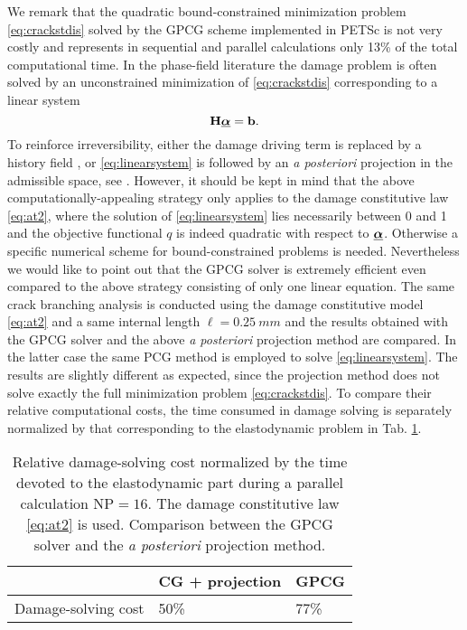 We remark that the quadratic bound-constrained minimization problem \eqref{eq:crackstdis} solved by the GPCG scheme implemented in PETSc is not very costly and represents in sequential and parallel calculations only 13\% of the total computational time. In the phase-field literature the damage problem is often solved by an unconstrained minimization of \eqref{eq:crackstdis} corresponding to a linear system
\begin{equation} \label{eq:linearsystem}
\vec{H}\dvec=\vec{b}.
\end{equation}
To reinforce irreversibility, either the damage driving term is replaced by a history field \cite{HofackerMiehe:2012,BordenVerhooselScottHughesLandis:2012}, or \eqref{eq:linearsystem} is followed by an \emph{a posteriori} projection in the admissible space, see \cite{LancioniRoyer-Carfagni:2009}. However, it should be kept in mind that the above computationally-appealing strategy only applies to the damage constitutive law \eqref{eq:at2}, where the solution of \eqref{eq:linearsystem} lies necessarily between 0 and 1 and the objective functional $q$ is indeed quadratic with respect to $\dvec$. Otherwise a specific numerical scheme for bound-constrained problems is needed. Nevertheless we would like to point out that the GPCG solver is extremely efficient even compared to the above strategy consisting of only one linear equation. The same crack branching analysis is conducted using the damage constitutive model \eqref{eq:at2} and a same internal length $\ell=\SI{0.25}{mm}$ and the results obtained with the GPCG solver and the above \emph{a posteriori} projection method are compared. In the latter case the same PCG method is employed to solve \eqref{eq:linearsystem}. The results are slightly different as expected, since the projection method does not solve exactly the full minimization problem \eqref{eq:crackstdis}. To compare their relative computational costs, the time consumed in damage solving is separately normalized by that corresponding to the elastodynamic problem in Tab. \ref{tab:gpcg_vs_cg_proj}.
\begin{table}[htbp]

\centering
\caption{Relative damage-solving cost normalized by the time devoted to the elastodynamic part during a parallel calculation $\mathrm{NP}=16$. The damage constitutive law \eqref{eq:at2} is used. Comparison between the GPCG solver and the \emph{a posteriori} projection method.} \label{tab:gpcg_vs_cg_proj}
\begin{tabular}{lll} \toprule
&  CG + projection & GPCG \\ \midrule
Damage-solving cost & 50\% & 77\% \\ \bottomrule
\end{tabular}
\end{table}
